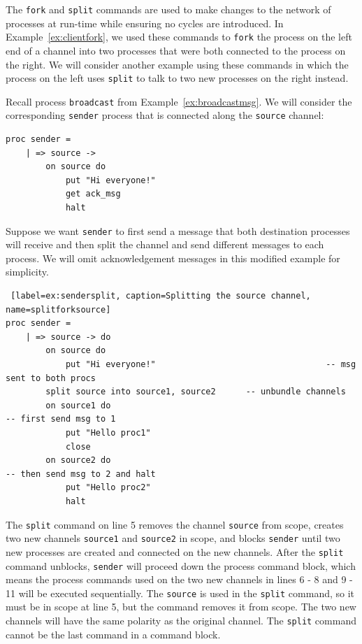 \documentclass[acmsmall]{acmart}
\begin{document}
The \lstinline$fork$ and \lstinline$split$ commands are used to make changes to the network of processes at run-time while ensuring no cycles are introduced.
In Example~\ref{ex:clientfork}, we used these commands to \lstinline$fork$ the process on the left end of a channel into two processes that were both connected to the process on the right.
We will consider another example using these commands in which the process on the left uses \lstinline$split$ to talk to two new processes on the right instead.

Recall process \lstinline$broadcast$ from Example~\ref{ex:broadcastmsg}.
We will consider the corresponding \lstinline$sender$ process that is connected along the \lstinline$source$ channel:
\begin{lstlisting}[label=ex:sender, caption=Process that sends messages to broadcast] 
proc sender =
	| => source ->
		on source do
			put "Hi everyone!"
			get ack_msg
			halt
\end{lstlisting} 

Suppose we want \lstinline$sender$ to first send a message that both destination processes will receive and then split the channel and send different messages to each process.
We will omit acknowledgement messages in this modified example for simplicity.
\begin{lstlisting} [label=ex:sendersplit, caption=Splitting the source channel, name=splitforksource] 
proc sender =
	| => source -> do
		on source do
			put "Hi everyone!"									-- msg sent to both procs
		split source into source1, source2		-- unbundle channels
		on source1 do													-- first send msg to 1
			put "Hello proc1"
			close
		on source2 do													-- then send msg to 2 and halt
			put "Hello proc2"
			halt
\end{lstlisting} 
The \lstinline$split$ command on line 5 removes the channel \lstinline$source$ from scope, creates two new channels \lstinline$source1$ and \lstinline$source2$ in scope, and blocks \lstinline$sender$ until two new processes are created and connected on the new channels.
After the \lstinline$split$ command unblocks, \lstinline$sender$ will proceed down the process command block, which means the process commands used on the two new channels in lines 6 - 8 and 9 - 11 will be executed sequentially.
The \lstinline$source$ is used in the \lstinline$split$ command, so it must be in scope at line 5, but the command removes it from scope.
The two new channels will have the same polarity as the original channel.
The \lstinline$split$ command cannot be the last command in a command block. 
\end{document}
